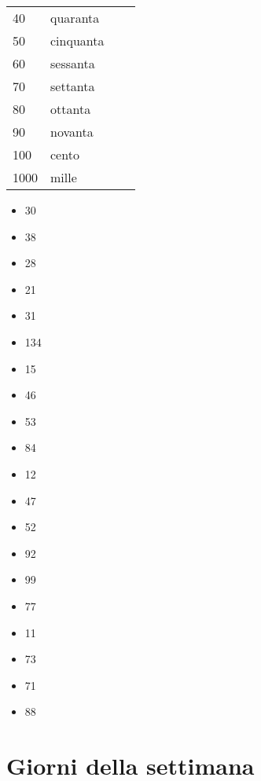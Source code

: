 \documentclass[letter,11pt]{article}
\begin{document}
\begin{multicols}{4}
    \begin{tabular}{ |p{0.6cm}| p{2cm}| p{0.5cm}| p{3cm}| }

    \hline
    \hline

     &   \\ \hline
    40 & quaranta \\ \hline
    50 & cinquanta  \\ \hline
    60 & sessanta \\ \hline
    70 & settanta \\ \hline
    80 & ottanta \\ \hline
    90 & novanta \\ \hline
    100 & cento \\ \hline
    1000 & mille \\ \hline

    \hline
    \end{tabular}

    \end{multicols}

\vskip 0.2in
\begin{multicols}{4}
\begin{itemize}
    \item 30
    \item 38
    \item 28
    \item 21
    \item 31
    \item 134
    \item 15
    \item 46
    \item 53
    \item 84
    \item 12
    \item 47
    \item 52
    \item 92
    \item 99
    \item 77
    \item 11
    \item 73
    \item 71
    \item 88

\end{itemize}
\end{multicols}

\vskip 0.2in
\section*{Giorni della settimana}
\vskip 0.2in
\end{document}
